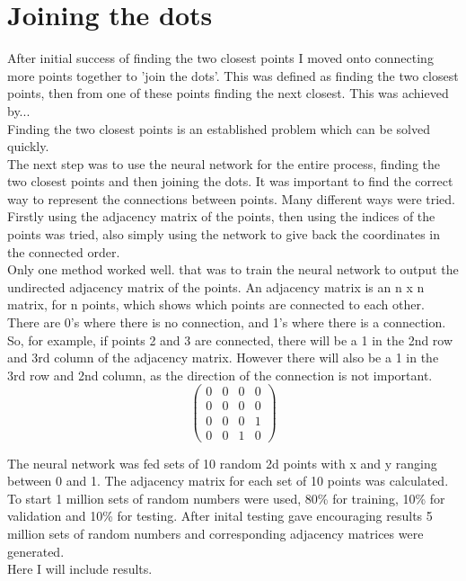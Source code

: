 \section{Joining the dots} %
After initial success of finding the two closest points I moved onto connecting more points together to 'join the dots'. This was defined as finding the two closest points, then from one of these points finding the next closest. This was achieved by...\\
Finding the two closest points is an established problem which can be solved quickly.\\
The next step was to use the neural network for the entire process, finding the two closest points and then joining the dots. It was important to find the correct way to represent the connections between points. Many different ways were tried. Firstly using the adjacency matrix of the points, then using the indices of the points was tried, also simply using the network to give back the coordinates in the connected order.\\
Only one method worked well. that was to train the neural network to output the undirected adjacency matrix of the points. An adjacency matrix is an n x n matrix, for n points, which shows which points are connected to each other. There are 0's where there is no connection, and 1's where there is a connection. So, for example, if points 2 and 3 are connected, there will be a 1 in the 2nd row and 3rd column of the adjacency matrix. However there will also be a 1 in the 3rd row and 2nd column, as the direction of the connection is not important. \\

\[
\begin{pmatrix}
0 & 0 & 0 & 0 \\
0 & 0 & 0 & 0 \\
0 & 0 & 0 & 1 \\
0 & 0 & 1 & 0
\end{pmatrix}
\]

The neural network was fed sets of 10 random 2d points with x and y ranging between 0 and 1. The adjacency matrix for each set of 10 points was calculated. To start 1 million sets of random numbers were used, 80\% for training, 10\% for validation and 10\% for testing. After inital testing gave encouraging results 5 million sets of random numbers and corresponding adjacency matrices were generated.\\

Here I will include results.

